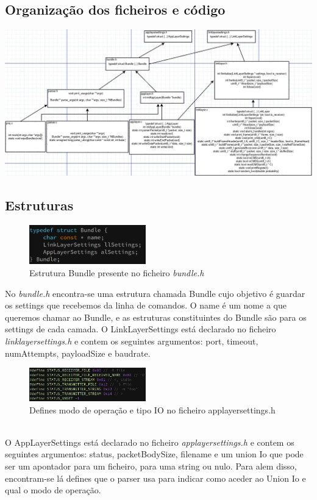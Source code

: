 \documentclass[a4paper]{article}
\begin{document}
\subsection{Organização dos ficheiros e código}
\centerline{\includegraphics[scale=0.70]{organizacaoFicheirosECodigo.png}}

\subsection{Estruturas}
\begin{figure}[h]
    \centering
    \includegraphics[width=0.45\textwidth]{bundleStruct.png}
    \caption{Estrutura Bundle presente no ficheiro \textit{bundle.h}}
\end{figure}
No \textit{bundle.h} encontra-se uma estrutura chamada Bundle cujo objetivo é
guardar os settings que recebemos da linha de comandos. O name é um nome a que
queremos chamar ao Bundle, e as estruturas constituintes do Bundle são para os
settings de cada camada. O LinkLayerSettings está declarado no ficheiro
\textit{linklayersettings.h} e contem os seguintes argumentos: port, timeout,
numAttempts, payloadSize e baudrate.
\begin{figure}[h]
\centering
    \includegraphics[width=0.45\textwidth]{status.png}
    \caption{Defines modo de operação e tipo IO no ficheiro
    applayersettings.h}
\end{figure}\\
O AppLayerSettings está declarado no
ficheiro \textit{applayersettings.h} e contem os seguintes argumentos: status,
packetBodySize, filename e um union Io que pode ser um apontador para um
ficheiro, para uma string ou nulo. Para alem disso, encontram-se lá defines que
o parser usa para indicar como aceder ao Union Io e qual o modo de
operação.\\\newline
\end{document}
